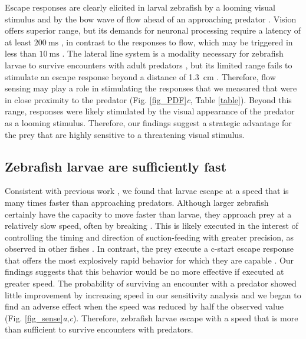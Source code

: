 \documentclass[]{rsos}%
\begin{document}
Escape responses are clearly elicited in larval zebrafish by a looming visual stimulus \cite{Bianco:2011ca} and by the bow wave of flow ahead of an approaching predator \cite{Stewart:2014cma}.
Vision offers superior range, but its demands for neuronal processing require a latency of at least $\SI{200}{\ms}$ \cite{Burgess:2007vp}, in contrast to the responses to flow, which may be triggered in less than $\SI{10}{\ms}$  \cite{Liu:1999fs}.
The lateral line system is a modality necessary for zebrafish larvae to survive encounters with adult predators \cite{Stewart:2013bha}, but its limited range fails to stimulate an escape response beyond a distance of \SI{1.3}{\cm} \cite{Stewart:2014cma}.
Therefore, flow sensing may play a role in stimulating the responses that we measured that were in close proximity to the predator (Fig. \ref{fig_PDF}\textit{c}, Table \ref{table}).
Beyond this range, responses were likely stimulated by the visual appearance of the predator as a looming stimulus. 
Therefore, our findings suggest a strategic advantage for the prey that are highly sensitive to a threatening visual stimulus. 

\subsection{Zebrafish larvae are sufficiently fast} 

Consistent with previous work \cite{Stewart:2013bha}, we found that larvae escape at a speed that is many times faster than approaching predators.
Although larger zebrafish certainly have the capacity to move faster than larvae, they approach prey at a relatively slow speed, often by breaking \cite{McHenry:2005tc}.
This is likely executed in the interest of controlling the timing and direction of suction-feeding with greater precision, as observed in other fishes \cite{Higham:2005iu,Higham:2007go}.
In contrast, the prey execute a c-start escape response that offers the most explosively rapid behavior for which they are capable \cite{Muller:2004hp}.
Our findings suggests that this behavior would be no more effective if executed at greater speed.
The probability of surviving an encounter with a predator showed little improvement by increasing speed in our sensitivity analysis and we began to find an adverse effect when the speed was reduced by half the observed value (Fig. \ref{fig_sense}\textit{a},\textit{c}).
Therefore, zebrafish larvae escape with a speed that is more than sufficient to survive encounters with predators.
\end{document}
